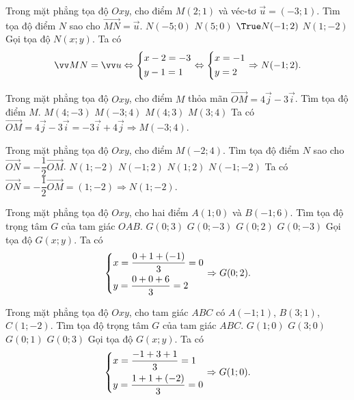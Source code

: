 \begin{ex}%
	Trong mặt phẳng tọa độ $Oxy$, cho điểm $M(2;1)$ và véc-tơ $\vec{u}=(-3;1)$. Tìm tọa độ điểm $N$ sao cho $\vec{MN}=\vec{u}$.
	\choice
	{$N(-5;0)$}
	{$N(5;0)$}
	{$\True N(-1;2)$}
	{$N(1;-2)$}
	\loigiai
	{
		Gọi tọa độ $N(x;y)$. Ta có
		\[\vec{MN}=\vec{u}\Leftrightarrow \heva{&x-2=-3\\ &y-1=1}\Leftrightarrow \heva{&x=-1\\ &y=2}\Rightarrow N(-1;2).\]
	}	
\end{ex}

\begin{ex}%
	Trong mặt phẳng tọa độ $Oxy$, cho điểm $M$ thỏa mãn $\vec{OM}=4\vec{j}-3\vec{i}$. Tìm tọa độ điểm $M$.
	\choice
	{$M(4;-3)$}
	{\True $M(-3;4)$}
	{$M(4;3)$}
	{$M(3;4)$}
	\loigiai
	{
		Ta có $\vec{OM}=4\vec{j}-3\vec{i}=-3\vec{i}+4\vec{j}\Rightarrow M(-3;4)$.
	}	
\end{ex}

\begin{ex}%
	Trong mặt phẳng tọa độ $Oxy$, cho điểm $M(-2;4)$. Tìm tọa độ điểm $N$ sao cho $\vec{ON}=-\dfrac{1}{2}\vec{OM}$.
	\choice
	{\True $N(1;-2)$}
	{$N(-1;2)$}
	{$N(1;2)$}
	{$N(-1;-2)$}
	\loigiai
	{
		Ta có $\vec{ON}=-\dfrac{1}{2}\vec{OM}=(1;-2)\Rightarrow N(1;-2)$.
	}	
\end{ex}

\begin{ex}%
	Trong mặt phẳng tọa độ $Oxy$, cho hai điểm $A(1;0)$ và $B(-1;6)$. Tìm tọa độ trọng tâm $G$ của tam giác $OAB$.
	\choice
	{$G(0;3)$}
	{$G(0;-3)$}
	{\True $G(0;2)$}
	{$G(0;-3)$}
	\loigiai
	{
		Gọi tọa độ $G(x;y)$. Ta có
		\[\left\{\begin{aligned}&x=\dfrac{0+1+(-1)}{3}=0\\ &y=\dfrac{0+0+6}{3}=2\end{aligned}\right.\Rightarrow G(0;2).\]
	}	
\end{ex}

\begin{ex}%
	Trong mặt phẳng tọa độ $Oxy$, cho tam giác $ABC$ có $A(-1;1)$, $B(3;1)$, $C(1;-2)$. Tìm tọa độ trọng tâm $G$ của tam giác $ABC$.
	\choice
	{\True $G(1;0)$}
	{$G(3;0)$}
	{$G(0;1)$}
	{$G(0;3)$}
	\loigiai
	{
		Gọi tọa độ $G(x;y)$. Ta có
		\[\left\{\begin{aligned}&x=\dfrac{-1+3+1}{3}=1\\ &y=\dfrac{1+1+(-2)}{3}=0\end{aligned}\right.\Rightarrow G(1;0).\]
	}		
\end{ex}	

